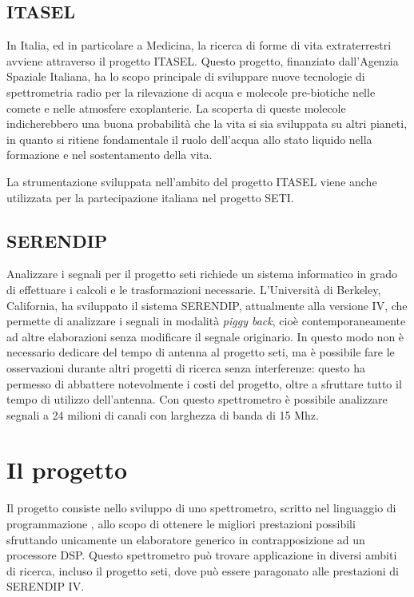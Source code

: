 \subsection*{\ac{ITASEL}}
In Italia, ed in particolare a Medicina, la ricerca di forme di vita
extraterrestri avviene attraverso il progetto \ac{ITASEL}. Questo progetto,
finanziato dall'Agenzia Spaziale Italiana, ha lo scopo principale di sviluppare
nuove tecnologie di spettrometria radio per la rilevazione di acqua e molecole
pre-biotiche nelle comete e nelle atmosfere exoplanterie. La scoperta di queste
molecole indicherebbero una buona probabilit\`a che la vita si sia sviluppata su
altri pianeti, in quanto si ritiene fondamentale il ruolo dell'acqua allo stato
liquido nella formazione e nel sostentamento della vita.

La strumentazione sviluppata nell'ambito del progetto \ac{ITASEL} viene anche
utilizzata per la partecipazione italiana nel progetto \ac{SETI}.

\subsection*{\ac{SERENDIP}}
Analizzare i segnali per il progetto \ac{seti} richiede un sistema informatico
in grado di effettuare i calcoli e le trasformazioni necessarie. L'Universit\`a
di Berkeley, California, ha sviluppato il sistema \ac{SERENDIP}, attualmente
alla versione IV, che permette di analizzare i segnali in modalit\`a \emph{piggy
back}, cio\`e contemporaneamente ad altre elaborazioni senza modificare il
segnale originario. In questo modo non \`e necessario dedicare del tempo di
antenna al progetto \ac{seti}, ma \`e possibile fare le osservazioni durante
altri progetti di ricerca senza interferenze: questo ha permesso di abbattere
notevolmente i costi del progetto, oltre a sfruttare tutto il tempo di utilizzo
dell'antenna. Con questo spettrometro \`e possibile analizzare segnali a 24
milioni di canali con larghezza di banda di 15 Mhz.

\section*{Il progetto}
Il progetto consiste nello sviluppo di uno spettrometro, scritto nel linguaggio
di programmazione \CC, allo scopo di ottenere le migliori prestazioni possibili
sfruttando unicamente un elaboratore generico in contrapposizione ad un
processore DSP. Questo spettrometro pu\`o trovare applicazione in diversi ambiti
di ricerca, incluso il progetto \ac{seti}, dove pu\`o essere paragonato alle
prestazioni di \ac{SERENDIP} IV.

